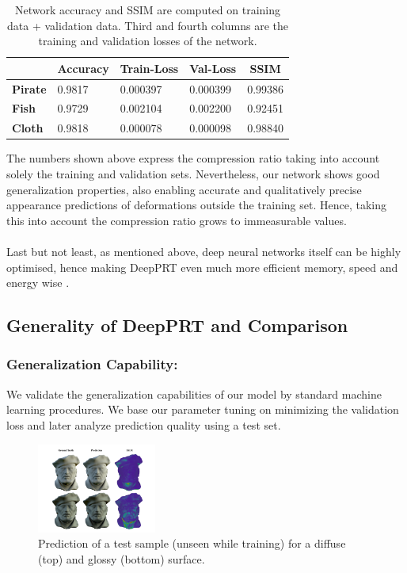 \begin{table}[h]
\begin{tabular}{|l|l|l|l|l|}
\hline
\textbf{}            & \textbf{Accuracy} & \textbf{Train-Loss} & \textbf{Val-Loss} & \multicolumn{1}{c|}{\textbf{SSIM}} \\ \hline
\textbf{Pirate} & 0.9817            & 0.000397            & 0.000399                 & 0.99386                      \\ \hline
\textbf{Fish}        & 0.9729            & 0.002104            & 0.002200                      &  0.92451                   \\ \hline
\textbf{Cloth}       & 0.9818            & 0.000078            & 0.000098                 & 0.98840                      \\ \hline
\end{tabular}
\caption{Network accuracy and SSIM are computed on training data + validation data. Third and fourth columns are the training and validation losses of the network.} 
\label{Table: NN_Accuracy}
\end{table}
The numbers shown above express the compression ratio taking into account solely the training and validation sets. Nevertheless, our network shows good generalization properties, also enabling accurate and qualitatively precise appearance predictions of deformations outside the training set. Hence, taking this into account the compression ratio grows to immeasurable values. 
\\
\\
Last but not least, as mentioned above, deep neural networks itself can be highly optimised, hence making DeepPRT even much more efficient memory, speed and energy wise \cite{Survey_NN_Compression}. 
\subsection*{Generality of DeepPRT and Comparison}
\subsubsection*{Generalization Capability:}
We validate the generalization capabilities of our model by standard machine learning procedures. We base our parameter tuning on minimizing the validation loss and later analyze prediction quality using a test set.
\begin{figure}[H]
  \centering
    \includegraphics[width=0.35\textwidth]{Figures/glossy_pirate.pdf}
     \caption{Prediction of a test sample (unseen while training) for a diffuse (top) and glossy (bottom) surface. }
     \label{Fig: glossy_pirate}
\end{figure}
